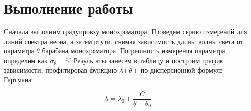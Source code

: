 \documentclass[12pt]{kiarticle} %
\begin{document}
	


	
	
	
	\section{Выполнение работы}
	
	Сначала выполним градуировку монохроматора. Проведем серию измерений для линий спектра неона, а затем ртути, снимая зависимость длины волны света от параметра $ \theta $ барабана монохроматора. Погрешность измерения параметра определим как $ \sigma_\theta = 5 ^\circ $ Результаты занесем в таблицу и построим график зависимости, профитировав функцию $ \lambda (\theta) $ по дисперсионной формуле Гартмана:
	
	\begin{equation}\label{labda(thta)}
	\lambda = \lambda_0 + \dfrac{C}{\theta - \theta_0}
	\end{equation}
	
\end{document}
